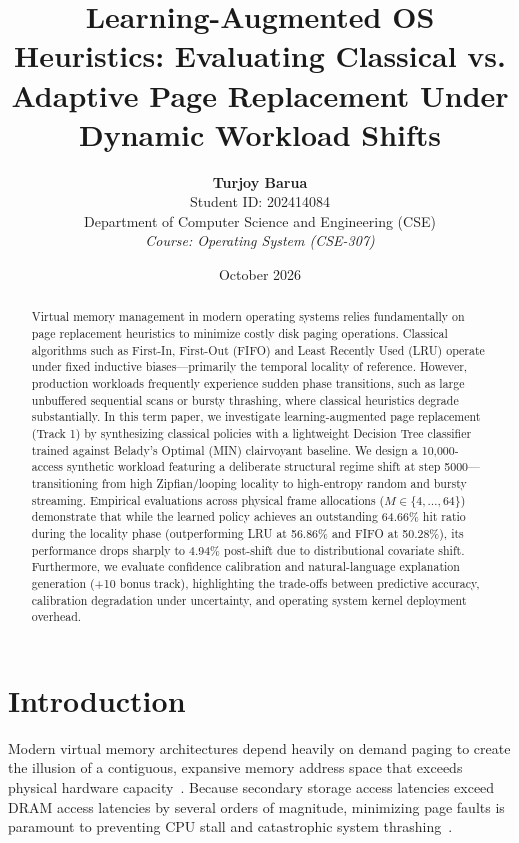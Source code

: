 \documentclass[10pt,twocolumn,a4paper]{article}
\title{\textbf{Learning-Augmented OS Heuristics: Evaluating Classical vs. Adaptive Page Replacement Under Dynamic Workload Shifts}}
\author{
    \textbf{Turjoy Barua} \\
    Student ID: 202414084 \\
    Department of Computer Science and Engineering (CSE) \\
    \textit{Course: Operating System (CSE-307)}
}
\date{October 2026}
\begin{document}
\maketitle

\begin{abstract}
Virtual memory management in modern operating systems relies fundamentally on page replacement heuristics to minimize costly disk paging operations. Classical algorithms such as First-In, First-Out (FIFO) and Least Recently Used (LRU) operate under fixed inductive biases—primarily the temporal locality of reference. However, production workloads frequently experience sudden phase transitions, such as large unbuffered sequential scans or bursty thrashing, where classical heuristics degrade substantially. In this term paper, we investigate learning-augmented page replacement (Track 1) by synthesizing classical policies with a lightweight Decision Tree classifier trained against Belady's Optimal (MIN) clairvoyant baseline. We design a 10,000-access synthetic workload featuring a deliberate structural regime shift at step 5000—transitioning from high Zipfian/looping locality to high-entropy random and bursty streaming. Empirical evaluations across physical frame allocations ($M \in \{4, \dots, 64\}$) demonstrate that while the learned policy achieves an outstanding 64.66\% hit ratio during the locality phase (outperforming LRU at 56.86\% and FIFO at 50.28\%), its performance drops sharply to 4.94\% post-shift due to distributional covariate shift. Furthermore, we evaluate confidence calibration and natural-language explanation generation (+10 bonus track), highlighting the trade-offs between predictive accuracy, calibration degradation under uncertainty, and operating system kernel deployment overhead.
\end{abstract}

\section{Introduction}
Modern virtual memory architectures depend heavily on demand paging to create the illusion of a contiguous, expansive memory address space that exceeds physical hardware capacity~\cite{silberschatz2018operating, ostep2018}. Because secondary storage access latencies exceed DRAM access latencies by several orders of magnitude, minimizing page faults is paramount to preventing CPU stall and catastrophic system thrashing~\cite{denning1968working}.
\end{document}
